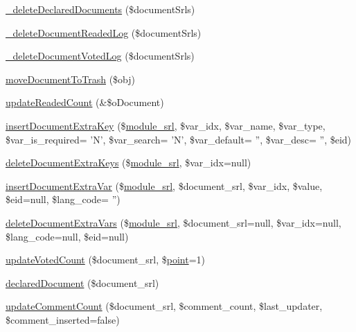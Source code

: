 \begin{DoxyCompactItemize}
\item 
\hyperlink{classdocumentController_a2514acfe313b7ddd5daccb50557d38b5}{\-\_\-delete\-Declared\-Documents} (\$document\-Srls)
\item 
\hyperlink{classdocumentController_ac055fa2cc48de200d0b319eddd7a13da}{\-\_\-delete\-Document\-Readed\-Log} (\$document\-Srls)
\item 
\hyperlink{classdocumentController_a9fe391d1b1ece3b7b16d15976c1622d0}{\-\_\-delete\-Document\-Voted\-Log} (\$document\-Srls)
\item 
\hyperlink{classdocumentController_a3f861f8df6113ca3211c48be3c49f305}{move\-Document\-To\-Trash} (\$obj)
\item 
\hyperlink{classdocumentController_a437461a6588e59e038ed54316bfa7893}{update\-Readed\-Count} (\&\$o\-Document)
\item 
\hyperlink{classdocumentController_a832207dfbf4dac2f32d4a365f9e5ea77}{insert\-Document\-Extra\-Key} (\$\hyperlink{ko_8install_8php_a370bb6450fab1da3e0ed9f484a38b761}{module\-\_\-srl}, \$var\-\_\-idx, \$var\-\_\-name, \$var\-\_\-type, \$var\-\_\-is\-\_\-required= 'N', \$var\-\_\-search= 'N', \$var\-\_\-default= '', \$var\-\_\-desc= '', \$eid)
\item 
\hyperlink{classdocumentController_a279894a3cef824bc940cda67ced511aa}{delete\-Document\-Extra\-Keys} (\$\hyperlink{ko_8install_8php_a370bb6450fab1da3e0ed9f484a38b761}{module\-\_\-srl}, \$var\-\_\-idx=null)
\item 
\hyperlink{classdocumentController_adb5345b43e9795d7e647754cb88b9b5a}{insert\-Document\-Extra\-Var} (\$\hyperlink{ko_8install_8php_a370bb6450fab1da3e0ed9f484a38b761}{module\-\_\-srl}, \$document\-\_\-srl, \$var\-\_\-idx, \$value, \$eid=null, \$lang\-\_\-code= '')
\item 
\hyperlink{classdocumentController_a1ebb5684cf99ea4044fa476c6d006bd2}{delete\-Document\-Extra\-Vars} (\$\hyperlink{ko_8install_8php_a370bb6450fab1da3e0ed9f484a38b761}{module\-\_\-srl}, \$document\-\_\-srl=null, \$var\-\_\-idx=null, \$lang\-\_\-code=null, \$eid=null)
\item 
\hyperlink{classdocumentController_aca82ae9abe825d3ee6182d3608e71e31}{update\-Voted\-Count} (\$document\-\_\-srl, \$\hyperlink{classpoint}{point}=1)
\item 
\hyperlink{classdocumentController_aa2cdd129c5f882d535e39728761d4168}{declared\-Document} (\$document\-\_\-srl)
\item 
\hyperlink{classdocumentController_a1813c01d82596b3ddb48c1bde746428e}{update\-Comment\-Count} (\$document\-\_\-srl, \$comment\-\_\-count, \$last\-\_\-updater, \$comment\-\_\-inserted=false)

\end{DoxyCompactItemize}
